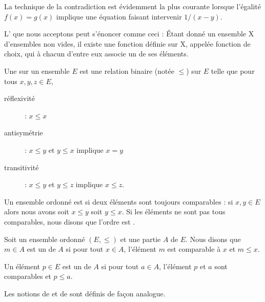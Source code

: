 La technique de la contradiction est évidemment la plus courante lorsque l'égalité \( f(x)=g(x)\) implique une équation faisant intervenir \( 1/(x-y)\).

\begin{normaltext}\label{NORooLMBYooYjUoju}
L' que nous acceptons peut s'énoncer comme ceci\cite{ooKLIXooHbpufL} : Étant donné un ensemble X d'ensembles non vides, il existe une fonction définie sur X, appelée fonction de choix, qui à chacun d'entre eux associe un de ses éléments.
\end{normaltext}

\begin{definition}      \label{DefooFLYOooRaGYRk}
    Une  sur un ensemble \( E\) est une relation binaire (notée \( \leq\)) sur \( E\) telle que pour tous \( x,y,z\in E\),
    \begin{description}
        \item[réflexivité] : \( x\leq x\)
         \item[antisymétrie] : \( x\leq y\) et \( y\leq x\) implique \( x=y\)
         \item[transitivité] : \( x\leq y\) et \( y\leq z\) implique \( x\leq z\).
    \end{description}
\end{definition}

\begin{definition}      \label{DEFooVGYQooUhUZGr}
    Un ensemble ordonné est  si deux éléments sont toujours comparables : si \( x,y\in E\) alors nous avons soit \( x\leq y\) soit \( y\leq x\). Si les éléments ne sont pas tous comparables, nous disons que l'ordre est .
\end{definition}

\begin{definition}
    Soit un ensemble ordonné \( (E,\leq)\) et une partie \( A\) de \( E\). Nous disons que \( m\in A\) est un  de \( A\) si pour tout \( x\in A\), l'élément \( m\) est comparable à \( x\) et \( m\leq x\).

    Un élément \( p\in E\) est un  de \( A\) si pour tout \( a\in A\), l'élément \( p\) et \( a\) sont comparables et \( p\leq a\).

    Les notions de  et de  sont définis de façon analogue.
\end{definition}

